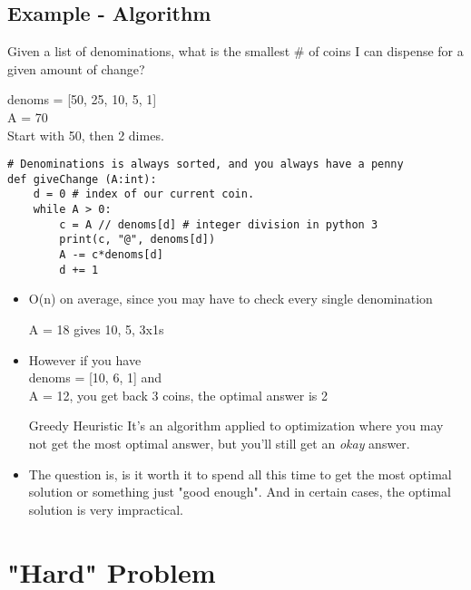 \documentclass{article}
\begin{document}
\subsection{Example - Algorithm}
\label{sec:orge378c10}
\begin{description}
\item[{Coin changing}] Given a list of denominations, what is the smallest \# of coins I can dispense for a given amount of change?
\item denoms = [50, 25, 10, 5, 1] \\
A = 70 \\
Start with 50, then 2 dimes.
\end{description}

\begin{verbatim}
# Denominations is always sorted, and you always have a penny
def giveChange (A:int):
    d = 0 # index of our current coin.
    while A > 0:
        c = A // denoms[d] # integer division in python 3
        print(c, "@", denoms[d])
        A -= c*denoms[d]
        d += 1
\end{verbatim}

\begin{itemize}
\item O(n) on average, since you may have to check every single denomination
\item[{A = 18}] gives 10, 5, 3x1s
\item However if you have \\
denoms = [10, 6, 1] and \\
A = 12, you get back 3 coins, the optimal answer is 2
\item[{Greedy Heuristic}] It's an algorithm applied to optimization where you may not get the most optimal answer, but you'll still get an \emph{okay} answer.
\item The question is, is it worth it to spend all this time to get the most optimal solution or something just "good enough". And in certain cases, the optimal solution is very impractical.
\end{itemize}

\section{"Hard" Problem}
\label{sec:org7e9c907}
\end{document}

